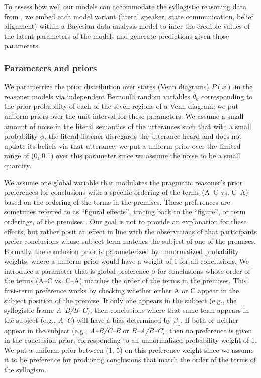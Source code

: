 \documentclass[floatsintext, doc]{apa6}
\begin{document}
To assess how well our models can accommodate the syllogistic reasoning data from , we embed each model variant (literal speaker, state communication, belief alignment) within a Bayesian data analysis model to infer the credible values of the latent parameters of the models and generate predictions given those parameters. 

\subsubsection{Parameters and priors}

We parametrize the prior distribution over states (Venn diagrams) $P(x)$ in the reasoner models via independent Bernoulli random variables $\theta_k$ corresponding to the prior probability of each of the seven regions of a Venn diagram; we put uniform priors over the unit interval for these parameters.
We assume a small amount of noise in the literal semantics of the utterances such that with a small probability $\phi$, the literal listener disregards the utterance heard and does not update its beliefs via that utterance; we put a uniform prior over the limited range of (0, 0.1) over this parameter since we assume the noise to be a small quantity. 

We assume one global variable that modulates the pragmatic reasoner's prior preferences for conclusions with a specific ordering of the terms (A--C vs. C--A) based on the ordering of the terms in the premises. 
These preferences are sometimes referred to as ``figural effects'', tracing back to the ``figure'', or term orderings, of the premises \cite{Wetherick1990, rips1994}.
Our goal is not to provide an explanation for these effects, but rather posit an effect in line with the observations of  that participants prefer conclusions whose subject term matches the subject of one of the premises.
Formally, the conclusion prior is parameterized by unnormalized probability weights, where a uniform prior would have a weight of 1 for all conclusions. 
We introduce a parameter that is global preference  $\beta$ for conclusions whose order of the terms (A--C vs. C--A) matches the order of the terms in the premises.
This first-term preference works by checking whether either A or C appear in the subject position of the premise.
If only one appears in the subject (e.g., the syllogistic frame \emph{A--B/B--C}), then conclusions where that same term appears in the subject (e.g., \emph{A--C}) will have a bias determined by $\beta_1$.
If both or neither appear in the subject (e.g., \emph{A--B/C--B} or \emph{B--A/B--C}), then no preference is given in the conclusion prior, corresponding to an unnormalized probability weight of 1. 
We put a uniform prior between (1, 5) on this preference weight since we assume it to be preference for producing conclusions that match the order of the terms of the syllogism. 
\end{document}
